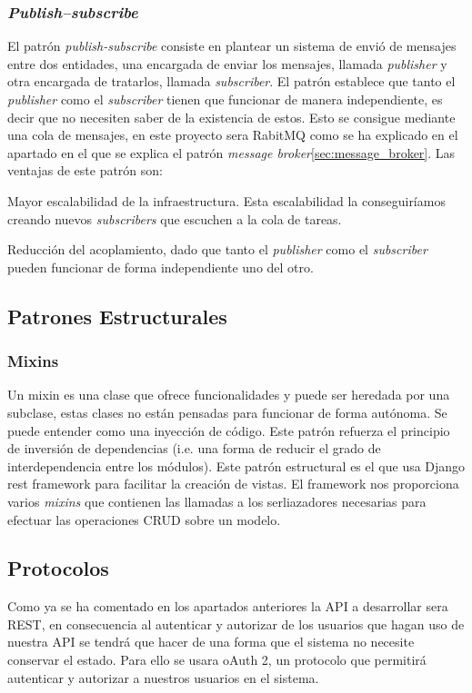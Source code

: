 \subsubsection{\textit{Publish–subscribe}}
\label{sec:pub-sub}
El patrón \textit{publish-subscribe} consiste en plantear un sistema de envió de mensajes entre dos entidades, una encargada de enviar los mensajes, llamada \textit{publisher} y otra encargada de tratarlos, llamada \textit{subscriber}. El patrón establece que tanto el \textit{publisher} como el \textit{subscriber} tienen que funcionar de manera independiente, es decir que no necesiten saber de la existencia de estos.
Esto se consigue mediante una cola de mensajes, en este proyecto sera RabitMQ como se ha explicado en el apartado en el que se explica el patrón \textit{message broker}\ref{sec:message_broker}.
Las ventajas de este patrón son:
\begin{description}
	\item Mayor escalabilidad de la infraestructura. Esta escalabilidad la conseguiríamos creando nuevos \textit{subscribers} que escuchen a la cola de tareas.
	\item Reducción del acoplamiento, dado que tanto el \textit{publisher} como el \textit{subscriber} pueden funcionar de forma independiente uno del otro.
\end{description}

\subsection{Patrones Estructurales}
\subsubsection{Mixins}
Un mixin es una clase que ofrece funcionalidades y puede ser heredada por una subclase, estas clases no están pensadas para funcionar de forma autónoma. Se puede entender como una inyección de código.
Este patrón refuerza el principio de inversión de dependencias (i.e. una forma de reducir el grado de interdependencia entre los módulos).
Este patrón estructural es el que usa Django rest framework para facilitar la creación de vistas. El framework nos proporciona varios \textit{mixins} que contienen las llamadas a los serliazadores necesarias para efectuar las operaciones CRUD sobre un modelo.

\subsection{Protocolos}
Como ya se ha comentado en los apartados anteriores la API a desarrollar sera REST, en consecuencia al autenticar y autorizar de los usuarios que hagan uso de nuestra API se tendrá que hacer de una forma que el sistema no necesite conservar el estado. Para ello se usara oAuth 2, un protocolo que permitirá autenticar y autorizar a nuestros usuarios en el sistema.

